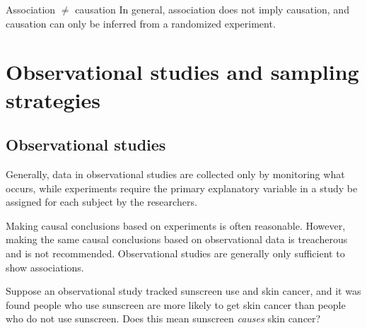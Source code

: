 \begin{onebox}{Association $\neq$ causation}
In general, association does not imply causation, and causation can only be inferred from a randomized experiment.
\end{onebox}



\section[Observational studies and sampling strategies]{Observational studies and sampling strategies}
\label{section_obs_data_sampling}


\subsection{Observational studies}

Generally, data in observational studies are collected only by monitoring what occurs, while experiments require the primary explanatory variable in a study be assigned for each subject by the researchers.

Making causal conclusions based on experiments is often reasonable. However, making the same causal conclusions based on observational data is treacherous and is not recommended. Observational studies are generally only sufficient to show associations.

\begin{exercisewrap}
\begin{nexercise} \label{sunscreenLurkingExample}
Suppose an observational study tracked sunscreen use and skin cancer, and it was found people who use sunscreen are more likely to get skin cancer than people who do not use sunscreen. Does this mean sunscreen \emph{causes} skin cancer?\footnotemark
\end{nexercise}
\end{exercisewrap}

